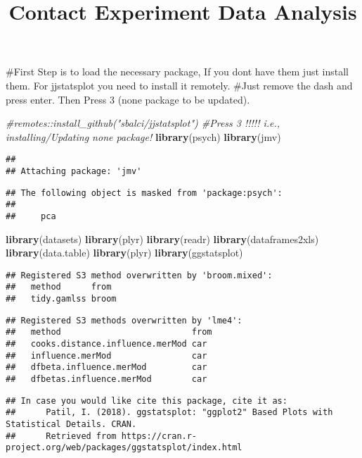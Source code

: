 \documentclass[
]{article}
\title{Contact Experiment Data Analysis}
\author{}
\date{\vspace{-2.5em}}
\newenvironment{Shaded}{\begin{snugshade}}{\end{snugshade}}
\newcommand{\CommentTok}[1]{\textcolor[rgb]{0.56,0.35,0.01}{\textit{#1}}}
\newcommand{\KeywordTok}[1]{\textcolor[rgb]{0.13,0.29,0.53}{\textbf{#1}}}
\newcommand{\NormalTok}[1]{#1}
\begin{document}
\maketitle

\#First Step is to load the necessary package, If you dont have them
just install them. For jjstatsplot you need to install it remotely.
\#Just remove the dash and press enter. Then Press 3 (none package to be
updated).

\begin{Shaded}
\begin{Highlighting}[]
\CommentTok{#remotes::install_github("sbalci/jjstatsplot") #Press 3 !!!!! i.e., installing/Updating none package! }
\KeywordTok{library}\NormalTok{(psych)}
\KeywordTok{library}\NormalTok{(jmv)}
\end{Highlighting}
\end{Shaded}

\begin{verbatim}
## 
## Attaching package: 'jmv'
\end{verbatim}

\begin{verbatim}
## The following object is masked from 'package:psych':
## 
##     pca
\end{verbatim}

\begin{Shaded}
\begin{Highlighting}[]
\KeywordTok{library}\NormalTok{(datasets)}
\KeywordTok{library}\NormalTok{(plyr)}
\KeywordTok{library}\NormalTok{(readr)}
\KeywordTok{library}\NormalTok{(dataframes2xls)}
\KeywordTok{library}\NormalTok{(data.table)}
\KeywordTok{library}\NormalTok{(plyr)}
\KeywordTok{library}\NormalTok{(ggstatsplot)}
\end{Highlighting}
\end{Shaded}

\begin{verbatim}
## Registered S3 method overwritten by 'broom.mixed':
##   method      from 
##   tidy.gamlss broom
\end{verbatim}

\begin{verbatim}
## Registered S3 methods overwritten by 'lme4':
##   method                          from
##   cooks.distance.influence.merMod car 
##   influence.merMod                car 
##   dfbeta.influence.merMod         car 
##   dfbetas.influence.merMod        car
\end{verbatim}

\begin{verbatim}
## In case you would like cite this package, cite it as:
##      Patil, I. (2018). ggstatsplot: "ggplot2" Based Plots with Statistical Details. CRAN.
##      Retrieved from https://cran.r-project.org/web/packages/ggstatsplot/index.html
\end{verbatim}
\end{document}
